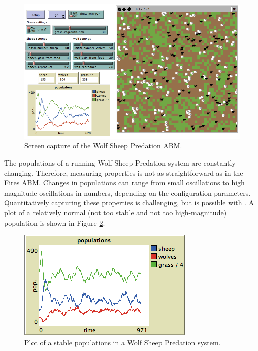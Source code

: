 \begin{figure}[ht]
\centering
\includegraphics[scale=.4]{images/wolfsheep_ss.png}
\caption{Screen capture of the Wolf Sheep Predation ABM.}
\label{fig:wolfsheepss}
\end{figure}

The populations of a running Wolf Sheep Predation system are constantly changing.
Therefore, measuring properties is not as straightforward as in the Fires ABM.
Changes in populations can range from small oscillations to high magnitude oscillations in numbers, depending on the configuration parameters.
Quantitatively capturing these properties is challenging, but is possible with \fw.
A plot of a relatively normal (not too stable and not too high-magnitude) population is shown in Figure \ref{fig:wsp_norm}.

\begin{figure}[ht]
\centering
\includegraphics[scale=.666667]{images/wolfsheep/wolfsheep_normal.png}
\caption{Plot of a stable populations in a Wolf Sheep Predation system.}
\label{fig:wsp_norm}
\end{figure}


